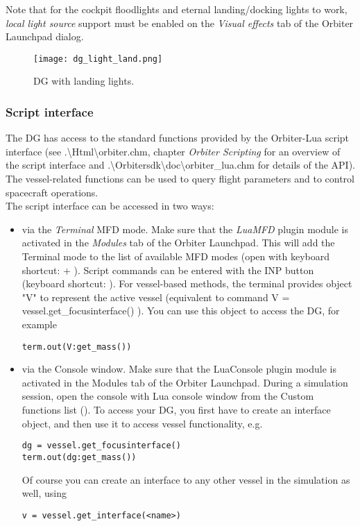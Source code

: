 \documentclass[Orbiter User Manual.tex]{subfiles}
\begin{document}
\noindent
Note that for the cockpit floodlights and eternal landing/docking lights to work, \textit{local light source} support must be enabled on the \textit{Visual effects} tab of the Orbiter Launchpad dialog.

\begin{figure}[H]
  \centering
  \texttt{[image: dg\_light\_land.png]}
  \caption{DG with landing lights.}
\end{figure}


\subsubsection{Script interface}
The DG has access to the standard functions provided by the Orbiter-Lua script interface (see .\textbackslash Html\textbackslash orbiter.chm, chapter \textit{Orbiter Scripting} for an overview of the script interface and .\textbackslash Orbitersdk\textbackslash doc\textbackslash orbiter\_lua.chm for details of the API). The vessel-related functions can be used to query flight parameters and to control spacecraft operations.\\
The script interface can be accessed in two ways:

\begin{itemize}
\item via the \textit{Terminal} MFD mode. Make sure that the \textit{LuaMFD} plugin module is activated in the \textit{Modules} tab of the Orbiter Launchpad. This will add the Terminal mode to the list of available MFD modes (open with keyboard shortcut: \Shift{} + \Shift{}). Script commands can be entered with the INP button (keyboard shortcut: \Shift{}). For vessel-based methods, the terminal provides object "V" to represent the active vessel (equivalent to command V = vessel.get\_focusinterface() ). You can use this object to access the DG, for example

\begin{lstlisting}[language=OSFS]
term.out(V:get_mass())
\end{lstlisting}

\item via the Console window. Make sure that the LuaConsole plugin module is activated in the Modules tab of the Orbiter Launchpad. During a simulation session, open the console with Lua console window from the Custom functions list (\Ctrl{}). To access your DG, you first have to create an interface object, and then use it to access vessel functionality, e.g.

\begin{lstlisting}[language=OSFS]
dg = vessel.get_focusinterface()
term.out(dg:get_mass())
\end{lstlisting}

\noindent
Of course you can create an interface to any other vessel in the simulation as well, using

\begin{lstlisting}[language=OSFS]
v = vessel.get_interface(<name>)
\end{lstlisting}

\end{itemize}
\end{document}
